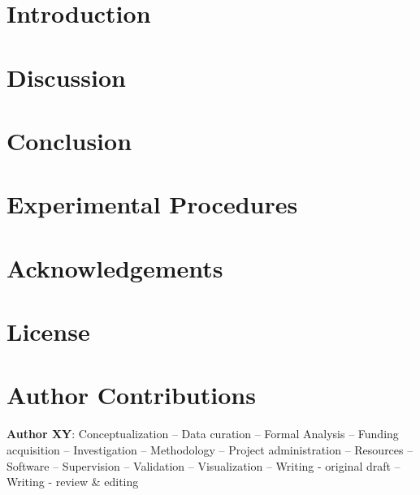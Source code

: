 \documentclass[12pt,preprint]{elsarticle}
\begin{document}
\section*{Introduction}
\label{sec:intro}






\section*{Discussion}
\label{sec:discussion}



\section*{Conclusion}
\label{sec:conclusion}



\section*{Experimental Procedures}
\label{sec:methods}



\section*{Acknowledgements}
\small


\section*{License}

\section*{Author Contributions}


\textbf{Author XY}:
Conceptualization --
Data curation --
Formal Analysis --
Funding acquisition --
Investigation --
Methodology --
Project administration --
Resources --
Software --
Supervision --
Validation --
Visualization --
Writing - original draft --
Writing - review \& editing
\end{document}
